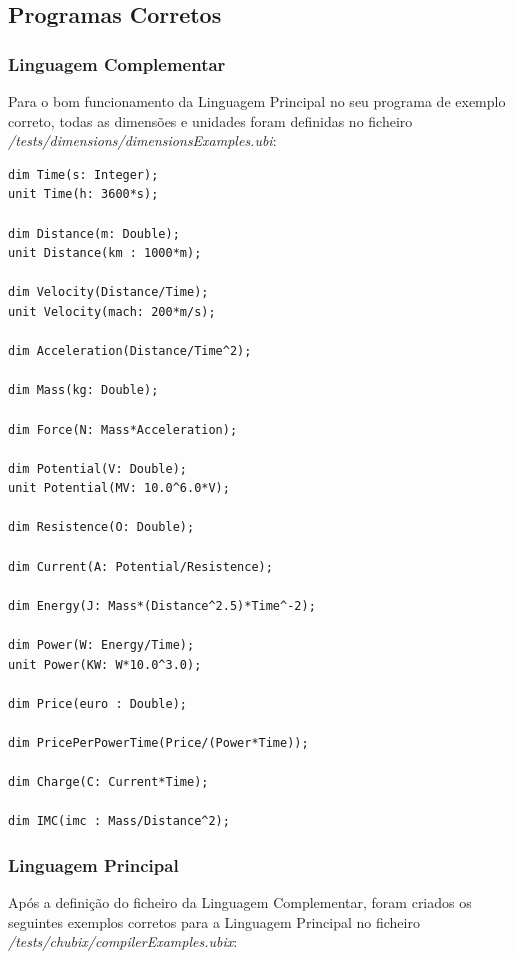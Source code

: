 \documentclass[10pt,portuguese]{article}
\begin{document}
\subsection{Programas Corretos}

\subsubsection{Linguagem Complementar}

\par Para o bom funcionamento da Linguagem Principal no seu programa de exemplo correto, todas as dimensões e unidades foram definidas no ficheiro \textit{/tests/dimensions/dimensionsExamples.ubi}:

\begin{lstlisting}[numbers=none]
dim Time(s: Integer);
unit Time(h: 3600*s);

dim Distance(m: Double);
unit Distance(km : 1000*m);

dim Velocity(Distance/Time);
unit Velocity(mach: 200*m/s);

dim Acceleration(Distance/Time^2);

dim Mass(kg: Double);

dim Force(N: Mass*Acceleration);

dim Potential(V: Double);
unit Potential(MV: 10.0^6.0*V);

dim Resistence(O: Double);

dim Current(A: Potential/Resistence);

dim Energy(J: Mass*(Distance^2.5)*Time^-2);

dim Power(W: Energy/Time);
unit Power(KW: W*10.0^3.0);

dim Price(euro : Double);

dim PricePerPowerTime(Price/(Power*Time));

dim Charge(C: Current*Time);

dim IMC(imc : Mass/Distance^2);
\end{lstlisting}

\clearpage

\subsubsection{Linguagem Principal}

\par Após a definição do ficheiro da Linguagem Complementar, foram criados os seguintes exemplos corretos para a Linguagem Principal no ficheiro \textit{/tests/chubix/compilerExamples.ubix}:
\end{document}
